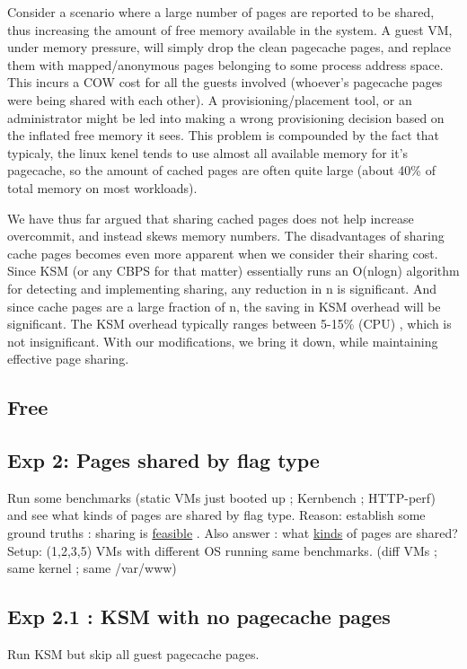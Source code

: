 \documentclass[11pt]{article}
\begin{document}
Consider a scenario where a large number of pages are reported to be
shared, thus increasing the amount of free memory available in the
system.
A guest VM, under memory pressure, will simply drop the clean
pagecache pages, and replace them with mapped/anonymous pages
belonging to some process address space. 
This incurs a COW cost for all the guests involved (whoever's
pagecache pages were being shared with each other). 
A provisioning/placement tool, or an administrator might be
led into making a wrong provisioning decision based on the inflated
free memory it sees. 
This problem is compounded by the fact that typicaly, the linux kenel
tends to use almost all available memory for it's pagecache, so the
amount of cached pages are often quite large (about 40\% of total
memory on most workloads). 

We have thus far argued that sharing cached pages does not help
increase overcommit, and instead skews memory numbers. 
The disadvantages of sharing cache pages becomes even more apparent
when we consider their sharing cost. 
Since KSM (or any CBPS for that matter) essentially runs an O(nlogn)
algorithm for detecting and implementing sharing, any reduction in n
is significant. And since cache pages are a large fraction of n, the
saving in KSM overhead will be significant. 
The KSM overhead typically ranges between 5-15\% (CPU) , which is not
insignificant.
With our modifications, we bring it down, while maintaining effective
page sharing. 
\subsection{Free}
\label{sec-5_6}
\subsection{Exp 2: Pages shared by flag type}
\label{sec-5_7}

Run some benchmarks (static VMs just booted up ; Kernbench ; HTTP-perf) and see what kinds of pages are shared by flag type.
Reason: establish some ground truths : sharing is \underline{feasible} . Also answer : what \underline{kinds} of pages are shared?
Setup: (1,2,3,5) VMs with different OS running same benchmarks. (diff VMs ; same kernel ; same /var/www) 
\subsection{Exp 2.1 : KSM with no pagecache pages}
\label{sec-5_8}

Run KSM but skip all guest pagecache pages.
\end{document}
